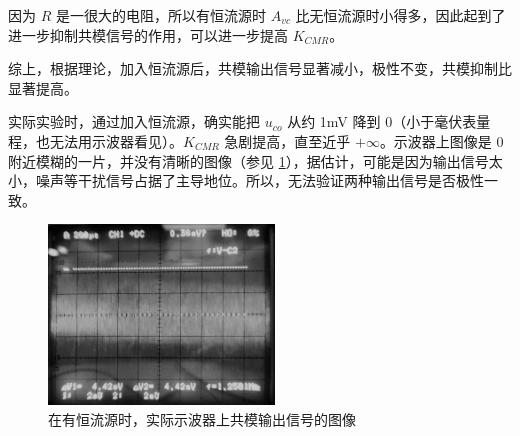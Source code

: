 \documentclass[a4paper,11pt,UTF8]{ctexart}
\newcommand{\p}{\par}
\begin{document}
\p 因为 $R$ 是一很大的电阻，所以有恒流源时 $A_{vc}$ 比无恒流源时小得多，因此起到了进一步抑制共模信号的作用，可以进一步提高 $K_{CMR}$。
\p 综上，根据理论，加入恒流源后，共模输出信号显著减小，极性不变，共模抑制比显著提高。
\p 实际实验时，通过加入恒流源，确实能把 $u_{co}$ 从约 1mV 降到 0（小于毫伏表量程，也无法用示波器看见）。$K_{CMR}$ 急剧提高，直至近乎 $+\infty$。示波器上图像是 0 附近模糊的一片，并没有清晰的图像（参见 \ref{fig:add-3-real}），据估计，可能是因为输出信号太小，噪声等干扰信号占据了主导地位。所以，无法验证两种输出信号是否极性一致。
\begin{figure}[H]
 \centering
 \includegraphics[width=6cm]{RealImage}
 \caption{在有恒流源时，实际示波器上共模输出信号的图像}
 \label{fig:add-3-real}
\end{figure}
\end{document}
